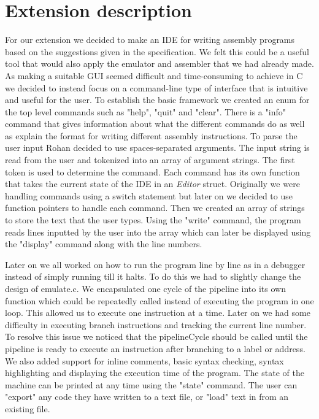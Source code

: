 \documentclass[11pt]{article}
\begin{document}
\section*{Extension description}

For our extension we decided to make an IDE for writing assembly programs based on the suggestions given in the specification. We felt this could be a useful tool that would also apply the emulator and assembler that we had already made. As making a suitable GUI seemed difficult and time-consuming to achieve in C we decided to instead focus on a command-line type of interface that is intuitive and useful for the user. To establish the basic framework we created an enum for the top level commands such as "help", "quit" and "clear". There is a "info" command that gives information about what the different commands do as well as explain the format for writing different assembly instructions. To parse the user input Rohan decided to use spaces-separated arguments. The input string is read from the user and tokenized into an array of argument strings. The first token is used to determine the command. Each command has its own function that takes the current state of the IDE in an \textit{Editor} struct. Originally we were handling commands using a switch statement but later on we decided to use function pointers to handle each command. Then we created an array of strings to store the text that the user types. Using the "write" command, the program reads lines inputted by the user into the array which can later be displayed using the "display" command along with the line numbers.

Later on we all worked on how to run the program line by line as in a debugger instead of simply running till it halts. To do this we had to slightly change the design of emulate.c. We encapsulated one cycle of the pipeline into its own function which could be repeatedly called instead of executing the program in one loop. This allowed us to execute one instruction at a time. Later on we had some difficulty in executing branch instructions and tracking the current line number. To resolve this issue we noticed that the pipelineCycle should be called until the pipeline is ready to execute an instruction after branching to a label or address. We also added support for inline comments, basic syntax checking, syntax highlighting and displaying the execution time of the program. The state of the machine can be printed at any time using the "state" command. The user can "export" any code they have written to a text file, or "load" text in from an existing file.
\end{document}
